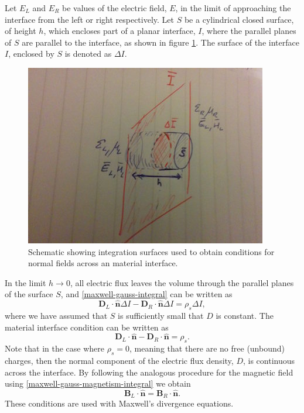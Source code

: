Let $E_L$ and $E_R$ be values of the electric field, $E$, in the limit of approaching the interface from the left or right respectively. Let $S$ be a cylindrical closed surface, of height $h$, which encloses part of a planar interface, $I$, where the parallel planes of $S$ are parallel to the interface, as shown in figure \ref{fig:material-interface-derivation:E-pillbox}. The surface of the interface $I$, enclosed by $S$ is denoted as $\Delta I$.
\begin{figure}[htbp!]
\begin{center}
    \includegraphics[scale=0.9]{Figures/Chapters/PhysicalProblem/interfaceEPillBox}
\end{center}
\caption{Schematic showing integration surfaces used to obtain conditions for normal fields across an material interface.}
\label{fig:material-interface-derivation:E-pillbox}
\end{figure}
In the limit $h \to 0$, all electric flux leaves the volume through the parallel planes of the surface $S$, and \ref{maxwell-gauss-integral} can be written as
$$
\mathbf{D}_L \cdot \hat{\mathbf{n}} \Delta I  - \mathbf{D}_R \cdot \hat{\mathbf{n}} \Delta I = \rho_s \Delta I,
$$
where we have assumed that $S$ is sufficiently small that $D$ is constant. The material interface condition can be written as
$$
\mathbf{D}_L \cdot \hat{\mathbf{n}} - \mathbf{D}_R \cdot \hat{\mathbf{n}} = \rho_s .
$$
Note that in the case where $\rho_s = 0$, meaning that there are no free (unbound) charges, then the normal component of the electric flux density, $D$, is continuous across the interface.
By following the analogous procedure for the magnetic field using \ref{maxwell-gauss-magnetism-integral} we obtain
$$
\mathbf{B}_L \cdot \hat{\mathbf{n}} = \mathbf{B}_R \cdot \hat{\mathbf{n}} .
$$
These conditions are used with Maxwell's divergence equations.

